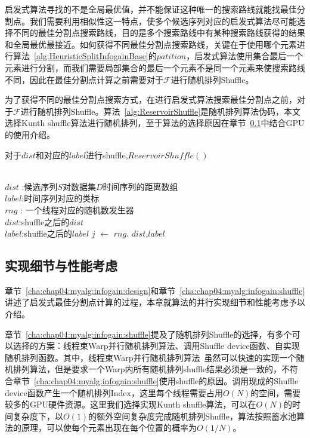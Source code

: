 启发式算法寻找的不是全局最优值，并不能保证这种唯一的搜索路线就能找最佳分割点。我们需要利用相似性这一特点，使多个候选序列对应的启发式算法尽可能选择不同的最佳分割点搜索路线，目的是多个搜索路线中有某种搜索路线获得的结果和全局最优最接近。如何获得不同最佳分割点搜索路线，关键在于使用哪个元素进行算法~\ref{alg:HeuristicSplitInfogainBase}的$patition$，启发式算法使用集合最后一个元素进行分割，而我们需要局部集合的最后一个元素不是同一个元素来使搜索路线不同，因此在最佳分割点计算之前需要对于$\mathcal{F}$进行随机排列Shuffle。

为了获得不同的最佳分割点搜索方式，在进行启发式算法搜索最佳分割点之前，对于$\mathcal{F}$进行随机排列Shuffle。算法~\ref{alg:ReservoirShuffle}是随机排列算法伪码，本文选择Kunth shuffle算法进行随机排列，至于算法的选择原因在章节~\ref{cha:chap04:Heuristic:Skill}中结合GPU的使用介绍。

\begin{algorithm}
	\caption{对于$dist$和对应的$label$进行shuffle,$ReservoirShuffle()$}
	\label{alg:ReservoirShuffle}
	\begin{algorithmic}[1]
		\Require ~~\\
		$dist$ :候选序列$S$对数据集$D$时间序列的距离数组\\
		$label$:时间序列对应的类标\\
		$rng$ : 一个线程对应的随机数发生器
		\Ensure ~~\\
		$dist$:shuffle之后的$dist$\\
		$label$:shuffle之后的$label$
				\State $j$ $\gets$ $rng.$
					\State {}
					\State {}
				\EndIf
			\EndFor
			\State \Return $dist$,$label$
		\EndFunction
	\end{algorithmic}
\end{algorithm}
\subsection{实现细节与性能考虑}
\label{cha:chap04:Heuristic:Skill}

章节~\ref{cha:chap04:myalg:infogain:design}和章节~\ref{cha:chap04:myalg:infogain:shuffle}讲述了启发式最佳分割点计算的过程，本章就算法的并行实现细节和性能考虑予以介绍。

章节~\ref{cha:chap04:myalg:infogain:shuffle}提及了随机排列Shuffle的选择，有多个可以选择的方案：线程束Warp并行随机排列算法、调用Shuffle device函数、自实现随机排列函数。其中，线程束Warp并行随机排列算法~\cite{nvidia2015c}虽然可以快速的实现一个随机排列算法，但是要求一个Warp内所有随机排列shuffle结果必须是一致的，不符合章节~\ref{cha:chap04:myalg:infogain:shuffle}使用shuffle的原因。调用现成的Shuffle device函数产生一个随机排列Index，这里每个线程需要占用$O(N)$的空间，需要较多的GPU硬件资源。这里我们选择实现Kunth shuffle算法，可以在$O(N)$的时间复杂度下，以$O(1)$的额外空间复杂度完成随机排列Shuffle，算法按照蓄水池算法的原理，可以使每个元素出现在每个位置的概率为$O(1/N)$。

